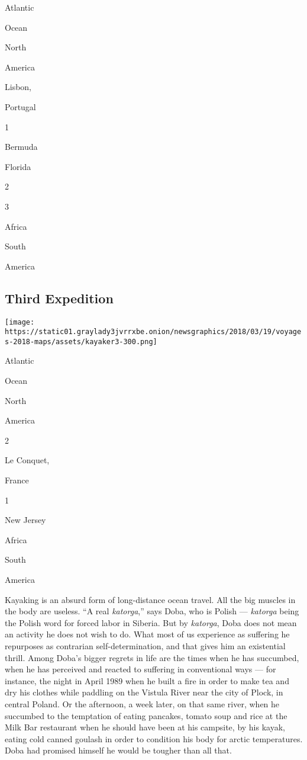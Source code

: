Atlantic

Ocean

North

America

Lisbon,

Portugal

1

Bermuda

Florida

2

3

Africa

South

America

\hypertarget{third-expedition}{%
\subsection{Third Expedition}\label{third-expedition}}

\texttt{[image: https://static01.graylady3jvrrxbe.onion/newsgraphics/2018/03/19/voyages-2018-maps/assets/kayaker3-300.png]}

Atlantic

Ocean

North

America

2

Le Conquet,

France

1

New Jersey

Africa

South

America

Kayaking is an absurd form of long-distance ocean travel. All the big
muscles in the body are useless. ``A real \emph{katorga},'' says Doba,
who is Polish --- \emph{katorga} being the Polish word for forced labor
in Siberia. But by \emph{katorga}, Doba does not mean an activity he
does not wish to do. What most of us experience as suffering he
repurposes as contrarian self-determination, and that gives him an
existential thrill. Among Doba's bigger regrets in life are the times
when he has succumbed, when he has perceived and reacted to suffering in
conventional ways --- for instance, the night in April 1989 when he
built a fire in order to make tea and dry his clothes while paddling on
the Vistula River near the city of Plock, in central Poland. Or the
afternoon, a week later, on that same river, when he succumbed to the
temptation of eating pancakes, tomato soup and rice at the Milk Bar
restaurant when he should have been at his campsite, by his kayak,
eating cold canned goulash in order to condition his body for arctic
temperatures. Doba had promised himself he would be tougher than all
that.

